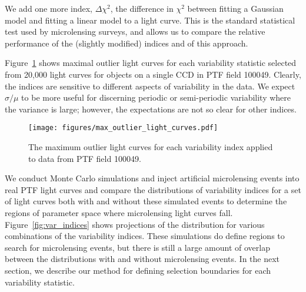 \documentclass{emulateapj}
\newcommand{\apwsim}{\raisebox{0.2ex}{\scriptsize$\sim$\normalsize}}
\begin{document}
We add one more index, $\Delta \chi^2$, the difference in $\chi^2$ between fitting a Gaussian model and fitting a linear model to a light curve. This is the standard statistical test used by microlensing surveys, and allows us to compare the relative performance of the (slightly modified) \cite{shin2009} indices and of this approach. 

Figure~\ref{fig:indices_examples} shows maximal outlier light curves for each variability statistic selected from \apwsim20,000 light curves for objects on a single CCD in PTF field 100049. Clearly, the indices are sensitive to different aspects of variability in the data. We expect $\sigma/\mu$ to be more useful for discerning periodic or semi-periodic variability where the variance is large; however, the expectations are not so clear for other indices. 

\begin{figure}
\centering\texttt{[image: figures/max\_outlier\_light\_curves.pdf]}
\caption{The maximum outlier light curves for each variability index applied to data from PTF field 100049.} \label{fig:indices_examples}
\end{figure}

We conduct Monte Carlo simulations and inject artificial microlensing events into real PTF light curves and compare the distributions of variability indices for a set of light curves both with and without these simulated events to determine the regions of parameter space where microlensing light curves fall. Figure~\ref{fig:var_indices} shows projections of the distribution for various combinations of the variability indices. These simulations do define regions to search for microlensing events, but there is still a large amount of overlap between the distributions with and without microlensing events. In the next section, we describe our method for defining selection boundaries for each variability statistic.


\begin{figure*}[t]
\centering
	
	
	\caption{Two-dimensional density histograms for projections of the six-dimensional variability statistic distribution for 10,000 light curves sampled from PTF field 100018 (right) and the equivalent with the same light curves with simulated microlensing events (left).} 
	\label{fig:var_indices}
\end{figure*}
\end{document}
